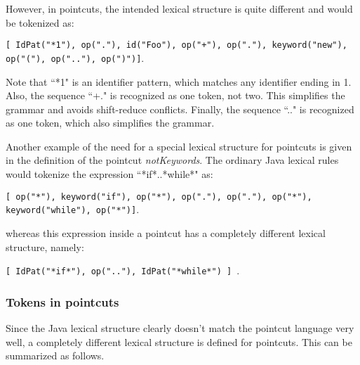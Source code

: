 \noindent
However, in
pointcuts, the intended lexical structure is quite different and
would be tokenized as:

{\tt[ IdPat("*1"), op("."), id("Foo"), op("+"), op("."),
keyword("new"), op("("), op(".."), op(")")]}.   

\noindent 
Note that ``*1" is
an identifier pattern, which matches any identifier ending in 1.  Also, the
sequence ``+." is recognized as one token, not two.  This simplifies
the grammar and avoids shift-reduce conflicts.  Finally, the sequence
``.." is recognized as one token, which also simplifies the grammar.

Another example of the need for a special lexical structure for pointcuts
is given in the definition of the pointcut {\em notKeywords}.   The ordinary
Java lexical rules would tokenize the expression ``*if*..*while*" as:

{\tt[ op("*"), keyword("if"), op("*"), op("."), op("."), op("*"), 
keyword("while"), op("*")]}.

\noindent
whereas this expression inside a pointcut has a completely different lexical
structure, namely:

{\tt[ IdPat("*if*"), op(".."), IdPat("*while*") ] }.
 
\subsubsection{Tokens in pointcuts}
Since the Java lexical structure clearly doesn't match the pointcut
language very well,  a completely different lexical structure is
defined for pointcuts.   This can be summarized as follows.

